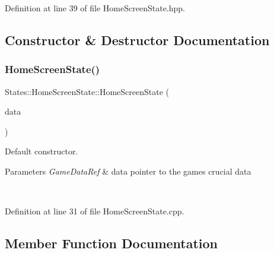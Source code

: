 \begin{DoxyVerb}\end{DoxyVerb}
 

Definition at line 39 of file Home\+Screen\+State.\+hpp.



\subsection{Constructor \& Destructor Documentation}
\mbox{\label{class_states_1_1_home_screen_state_afce4f5145fb10c864de2c3aa86455e40}} 
\subsubsection{\texorpdfstring{HomeScreenState()}{HomeScreenState()}}
{\footnotesize\ttfamily States\+::\+Home\+Screen\+State\+::\+Home\+Screen\+State (\begin{DoxyParamCaption}\item[{\mbox{\hyperlink{namespace_arktis_engine_a52e783ae007274e2a6eccc201d9400a5}{Arktis\+Engine\+::\+Game\+Data\+Ref}}}]{data }\end{DoxyParamCaption})}



Default constructor. 


\begin{DoxyParams}{Parameters}
{\em Game\+Data\+Ref} & data pointer to the game\textquotesingle{}s crucial data \begin{DoxyVerb}\end{DoxyVerb}
 \\
\hline
\end{DoxyParams}


Definition at line 31 of file Home\+Screen\+State.\+cpp.


\begin{DoxyCode}{0}

\end{DoxyCode}


\subsection{Member Function Documentation}
\mbox{\label{class_states_1_1_home_screen_state_aef921fb2964bf40565ba6fd2efacd3b4}} 

